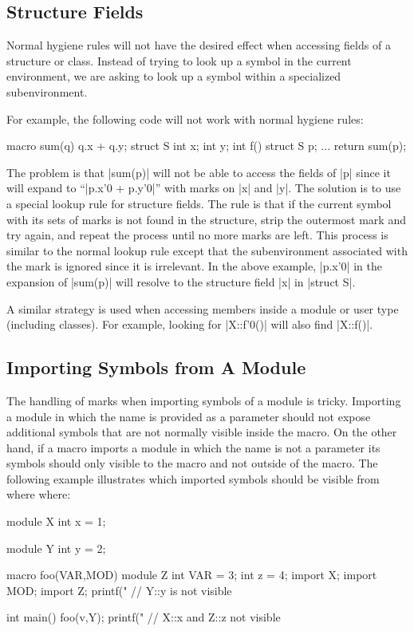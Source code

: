 \subsection{Structure Fields}

Normal hygiene rules will not have the desired effect when accessing
fields of a structure or class.  Instead of trying to look up a symbol
in the current environment, we are asking to look up a symbol within a
specialized subenvironment.

For example, the following code will not work with normal hygiene rules:
\begin{code}
macro sum(q) {q.x + q.y;}
struct S {int x; int y;}
int f() {
  struct S p;
  ...
  return sum(p);
}
\end{code}
The problem is that
|sum(p)| will not be able to access the fields of |p| since
it will expand to ``|p.x'0 + p.y'0|'' with marks on |x| and
|y|.  The solution is to use a special lookup rule for structure
fields.  The rule is that if the current symbol with its sets of
marks is not found in the structure, strip the outermost mark and try
again, and repeat the process until no more marks are left.  This
process is similar to the normal lookup rule except that the
subenvironment associated with the mark is ignored since it is
irrelevant.  In the above example, |p.x'0| in the expansion of
|sum(p)| will resolve to the structure field |x| in
|struct S|.

A similar strategy is used when accessing members inside a module or
user type (including classes).  For example, looking for |X::f'0()|
will also find |X::f()|.

\subsection{Importing Symbols from A Module}
\label{module-import}

The handling of marks when importing symbols of a module is tricky.
Importing a module in which the name is provided as a parameter should
not expose additional symbols that are not normally visible inside the
macro.  On the other hand, if a macro imports a module in which the
name is not a parameter its symbols should only visible to the macro
and not outside of the macro.  The following example illustrates which
imported symbols should be visible from where where:
\begin{code}
module X {int x = 1;}

module Y {int y = 2;}

macro foo(VAR,MOD) {
  module Z {int VAR = 3;
            int z = 4;}
  import X; import MOD; import Z;
  printf("%
  // Y::y is not visible
}

int main() {
  foo(v,Y);
  printf("%
  // X::x and Z::z not visible
}
\end{code}

